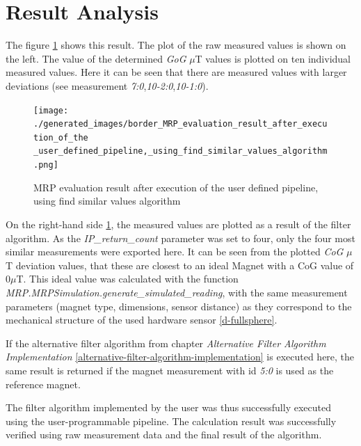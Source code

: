 \hypertarget{result-analysis}{%
\section{Result Analysis}\label{result-analysis}}

The figure
\ref{MRP_evaluation_result_after_execution_of_the _user_defined_pipeline,_using_find_similar_values_algorithm.png}
shows this result. The plot of the raw measured values is shown on the
left. The value of the determined \emph{GoG} \(\mu\)T values is plotted
on ten individual measured values. Here it can be seen that there are
measured values with larger deviations (see measurement
\emph{7:0},\emph{10-2:0},\emph{10-1:0}).

\begin{figure}
\centering
\texttt{[image: ./generated\_images/border\_MRP\_evaluation\_result\_after\_execution\_of\_the \_user\_defined\_pipeline,\_using\_find\_similar\_values\_algorithm.png]}
\caption{MRP evaluation result after execution of the user defined
pipeline, using find similar values algorithm
\label{MRP_evaluation_result_after_execution_of_the _user_defined_pipeline,_using_find_similar_values_algorithm.png}}
\end{figure}

On the right-hand side
\ref{MRP_evaluation_result_after_execution_of_the _user_defined_pipeline,_using_find_similar_values_algorithm.png},
the measured values are plotted as a result of the filter algorithm. As
the \emph{IP\_return\_count} parameter was set to four, only the four
most similar measurements were exported here. It can be seen from the
plotted \emph{CoG} \(\mu\)T deviation values, that these are closest to
an ideal Magnet with a CoG value of 0\(\mu\)T. This ideal value was
calculated with the function
\emph{MRP.MRPSimulation.generate\_simulated\_reading}, with the same
measurement parameters (magnet type, dimensions, sensor distance) as
they correspond to the mechanical structure of the used hardware sensor
\ref{d-fullsphere}.

If the alternative filter algorithm from chapter \emph{Alternative
Filter Algorithm Implementation}
\ref{alternative-filter-algorithm-implementation} is executed here, the
same result is returned if the magnet measurement with \gls{id}
\emph{5:0} is used as the reference magnet.

The filter algorithm implemented by the user was thus successfully
executed using the user-programmable pipeline. The calculation result
was successfully verified using raw measurement data and the final
result of the algorithm.

